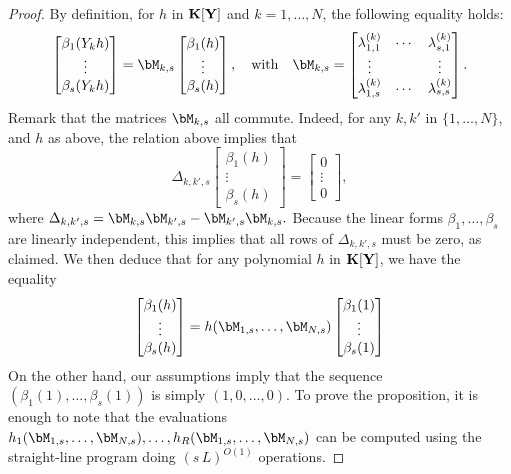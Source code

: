 \documentclass[12pt]{article}
\begin{document}
\begin{proof}
  By definition, for $h$ in $\mathbf{K}[\mathbf{Y}]$ and $k=1,\dots,N$, the following equality
  holds:
$$
  \begin{bmatrix}
    \beta_1(Y_k h)\\
    \vdots\\
    \beta_s(Y_k h)
  \end{bmatrix}=
\bM_{k,s}
  \begin{bmatrix}
    \beta_1(h)\\
    \vdots\\
    \beta_s(h)
  \end{bmatrix},
\quad\text{with}\quad
\bM_{k,s}= \begin{bmatrix}
    \lambda^{(k)}_{1,1} & \cdots & \lambda^{(k)}_{s,1}\\
    \vdots && \vdots \\
    \lambda^{(k)}_{1,s} & \cdots & \lambda^{(k)}_{s,s}
  \end{bmatrix}.
$$ 
 Remark that the matrices $\bM_{k,s}$ all commute. Indeed, 
for any $k,k'$ in $\{1,\dots,N\}$, and $h$ as above, the relation above implies
that 
$$
\Delta_{k,k',s}
  \begin{bmatrix}
    \beta_1(h)\\
    \vdots\\
    \beta_s(h)
  \end{bmatrix} =
  \begin{bmatrix}
0\\ \vdots \\ 0 
  \end{bmatrix},
$$
where $\Delta_{k,k',s} = \bM_{k,s}\bM_{k',s}-\bM_{k',s}\bM_{k,s}.$ Because 
the linear forms $\beta_1,\dots,\beta_s$ are linearly independent, this implies
that all rows of $\Delta_{k,k',s}$ must be zero, as claimed.
We then deduce that for any polynomial $h$ in $\mathbf{K}[\mathbf{Y}]$, we have
the equality
$$  \begin{bmatrix}
    \beta_1(h)\\
    \vdots\\
    \beta_s(h)
  \end{bmatrix} =
h(\bM_{1,s},\dots,\bM_{N,s})   \begin{bmatrix}
    \beta_1(1)\\
    \vdots\\
    \beta_s(1)
  \end{bmatrix} $$ On the other hand, our assumptions imply that the
  sequence $(\beta_1(1),\dots,\beta_s(1))$ is simply $(1,0,\dots,0)$.
  To prove the proposition, it is enough to note that the evaluations \sloppy
  $h_1(\bM_{1,s},\dots,\bM_{N,s}),\dots,h_R(\bM_{1,s},\dots,\bM_{N,s})$
  can be computed using the straight-line program doing
  $(s\,L)^{O(1)}$ operations.
\end{proof}
\end{document}
